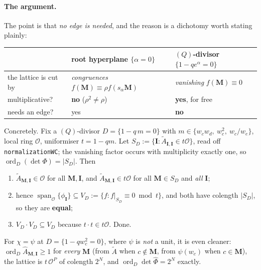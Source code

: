 \documentclass[11pt]{article}
\newcommand{\At}{\widetilde{A}}
\newcommand{\Ah}{\widehat{A}}
\newcommand{\bM}{\mathbf{M}}
\newcommand{\bI}{\mathbf{I}}
\begin{document}
\paragraph{The argument.}  The point is that \emph{no edge is needed}, and the
reason is a dichotomy worth stating plainly:

\begin{center}
\begin{tabular}{lll}
\toprule
 & root hyperplane $\{\alpha=0\}$ & $(Q)$-divisor $\{1-qe^{\alpha}=0\}$\\\midrule
the lattice is cut by & \emph{congruences} $f(\bM)\equiv\rho f(s_\alpha\bM)$
   & \emph{vanishing} $f(\bM)\equiv0$\\
multiplicative? & \textbf{no} ($\rho^2\ne\rho$) & \textbf{yes}, for free\\
needs an edge? & yes & \textbf{no}\\
\bottomrule
\end{tabular}
\end{center}

\noindent
Concretely.  Fix a $(Q)$-divisor $D=\{1-q\,m=0\}$ with
$m\in\{w_cw_d,\ w_c^2,\ w_c/w_e\}$, local ring $\mathcal O$, uniformiser
$t=1-qm$.  Let $S_D:=\{\bI:\At_{\bI,\bI}\in t\mathcal O\}$, read off
\texttt{normalizationWC}; the vanishing factor occurs with multiplicity exactly
one, so $\operatorname{ord}_D(\det\Phi)=|S_D|$.  Then
\begin{enumerate}
\item $\At_{\bM,\bI}\in\mathcal O$ for all $\bM,\bI$, and
  $\At_{\bM,\bI}\in t\mathcal O$ for all $\bM\in S_D$ and \emph{all} $\bI$;
\item hence $\operatorname{span}_{\mathcal O}\{\phi_{\bI}\}\subseteq
  V_D:=\{f:f|_{S_D}\equiv0\bmod t\}$, and both have colength $|S_D|$, so they are
  \textbf{equal};
\item $V_D\cdot V_D\subseteq V_D$ because $t\cdot t\in t\mathcal O$.  Done.
\end{enumerate}
For $\chi=\psi$ at $D=\{1-qw_c^2=0\}$, where $\psi$ is \emph{not} a unit, it is
even cleaner: $\operatorname{ord}_D\Ah_{\bM,\bI}\ge1$ for \emph{every} $\bM$
(from $\At$ when $c\notin\bM$, from $\psi(w_c)$ when $c\in\bM$), the lattice is
$t\,\mathcal O^{P}$ of colength $2^N$, and $\operatorname{ord}_D\det\widehat\Phi
=2^N$ exactly.
\end{document}
